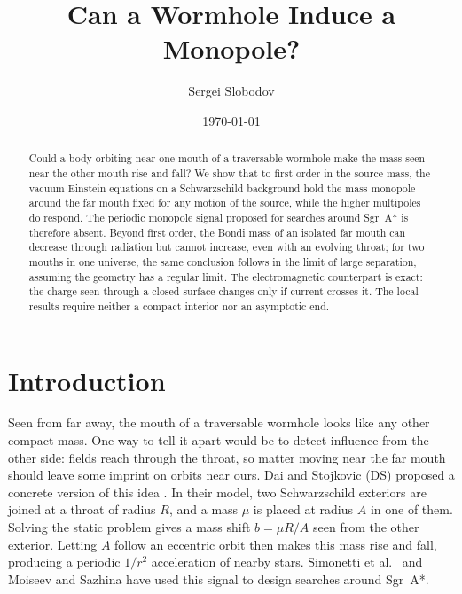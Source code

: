 \documentclass[aps,prd,10pt,onecolumn,nofootinbib,superscriptaddress,floatfix]{revtex4-2}
\begin{document}
\raggedbottom

\title{Can a Wormhole Induce a Monopole?}

\author{Sergei Slobodov}
\noaffiliation

\date{\today}

\begin{abstract}
Could a body orbiting near one mouth of a traversable wormhole make the mass
seen near the other mouth rise and fall?  We show that to first order in the
source mass, the vacuum Einstein equations on a Schwarzschild background hold
the mass monopole around the far mouth fixed for any motion of the source, while the higher multipoles do
respond.  The periodic monopole signal proposed for searches around Sgr~A*
is therefore absent.  Beyond first order, the Bondi mass of an isolated far mouth can
decrease through radiation but cannot increase, even with an evolving throat;
for two mouths in one universe, the same conclusion follows in the limit of
large separation, assuming the geometry has a regular limit.  The
electromagnetic counterpart is exact: the charge seen through a closed surface
changes only if current crosses it.  The local results require neither a
compact interior nor an asymptotic end.
\end{abstract}

\maketitle

\section{Introduction}
\label{sec:introduction}

Seen from far away, the mouth of a traversable wormhole looks like any other
compact mass.  One way to tell it apart would be to detect influence from the
other side: fields reach through the throat, so matter moving near the far
mouth should leave some imprint on orbits near ours.  Dai and Stojkovic (DS)
proposed a concrete version of this idea
\cite{DaiStojkovic2019Observing}.  In their model, two Schwarzschild exteriors
are joined at a throat of radius $R$, and a mass $\mu$ is placed at radius $A$ in
one of them.  Solving the static problem gives a mass shift $b=\mu R/A$ seen
from the other exterior.  Letting $A$ follow an eccentric orbit then makes
this mass rise and fall, producing a periodic $1/r^2$ acceleration of nearby
stars.  Simonetti et al.\ \cite{SimonettiEtAl2021SensitiveSearches} and
Moiseev and Sazhina \cite{MoiseevSazhina2025ObservationalSearch} have used
this signal to design searches around Sgr~A*.
\end{document}
